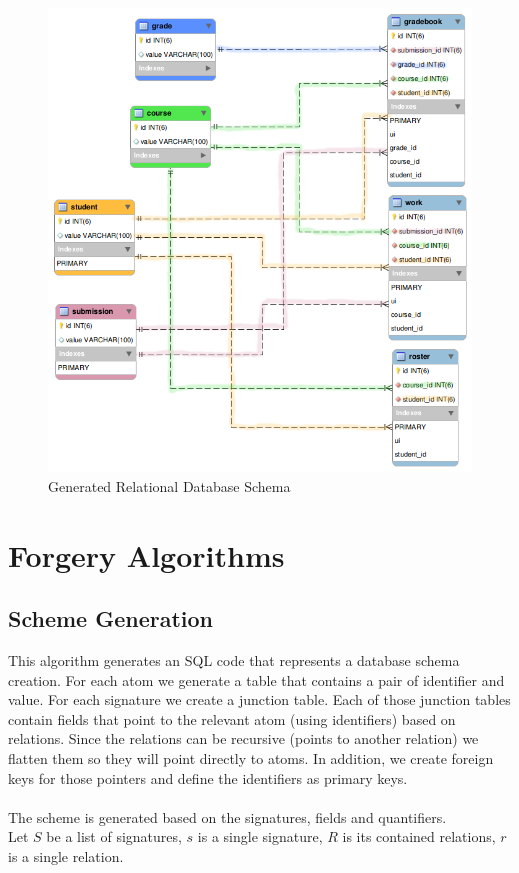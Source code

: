 \documentclass[oneside]{book}
\begin{document}
\newpage

\begin{figure}[h!]
\centering
\includegraphics[scale=0.5]{3}
\caption{Generated Relational Database Schema}
\end{figure}

\newpage

\section{Forgery Algorithms}
\label{sec:algorithm}

\subsection{Scheme Generation}
This algorithm generates an SQL code that represents a database schema creation. For each atom we generate a table that contains a pair of identifier and value. For each signature we create a junction table. Each of those junction tables contain fields that point to the relevant atom (using identifiers) based on relations. Since the relations can be recursive (points to another relation) we flatten them so they will point directly to atoms. In addition, we create foreign keys for those pointers and define the identifiers as primary keys.
\\\\
The scheme is generated based on the signatures, fields and quantifiers.\\
Let $S$ be a list of signatures, $s$ is a single signature, $R$ is its contained relations, $r$ is a single relation.
\end{document}
